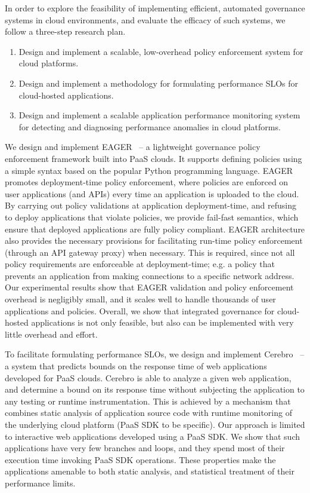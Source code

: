 In order to explore the feasibility of implementing efficient, automated governance systems in 
cloud environments, and evaluate the efficacy of such systems, we follow a three-step
research plan.
\begin{enumerate}
\item Design and implement a scalable, low-overhead policy enforcement system for cloud platforms.
\item Design and implement a methodology for formulating performance SLOs for cloud-hosted applications.
 \item Design and implement a scalable application performance monitoring system for 
 detecting and diagnosing performance anomalies in cloud platforms.
\end{enumerate}

We design and implement EAGER~\cite{6903538, eager-fop15} -- a lightweight governance policy
enforcement framework built into PaaS clouds. It supports defining policies using a simple syntax
based on the popular Python programming language. EAGER promotes deployment-time
policy enforcement, where policies are enforced on user applications (and APIs) every time
an application is uploaded to the cloud. By carrying out policy validations at
application deployment-time, and refusing to deploy applications that violate policies,
 we provide fail-fast semantics, which ensure that deployed applications are fully policy compliant. 
EAGER architecture also provides the necessary provisions for facilitating run-time policy
enforcement (through an API gateway proxy) when necessary. This is required, since not all
policy requirements are enforceable at deployment-time; e.g. a policy that prevents an
application from making connections to a specific network address. Our experimental results show
that EAGER validation and policy enforcement overhead is negligibly small, and it scales well to
handle thousands of user applications and policies. Overall, we show that integrated governance
for cloud-hosted applications is not only feasible, but also can be implemented with very
little overhead and effort.

To facilitate formulating performance SLOs, we design and implement 
Cerebro~\cite{Jayathilaka:2015:RTS:2806777.2806842} --
a system that predicts bounds on the response time of web applications developed for PaaS clouds.
Cerebro is able to analyze a given web application, and determine a bound on its response time without
subjecting the application to any testing or runtime instrumentation. This is achieved by a mechanism
that combines static analysis of application source code with runtime monitoring of the underlying
cloud platform (PaaS SDK to be specific). Our approach is limited to interactive web applications
developed using a PaaS SDK. We show that such applications have very few branches and loops, 
and they spend most of their execution time invoking PaaS SDK operations. These properties
make the applications amenable to both static analysis, and statistical treatment of their 
performance limits.

